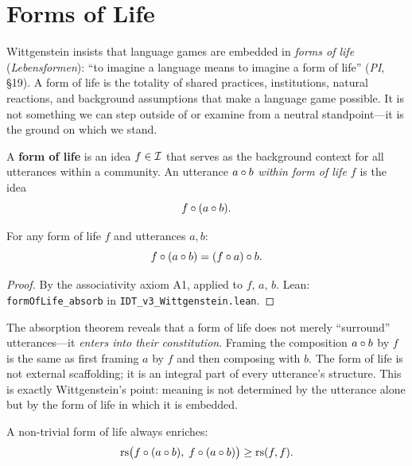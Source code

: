 \section{Forms of Life}

Wittgenstein insists that language games are embedded in \emph{forms of life}
(\textit{Lebensformen}): ``to imagine a language means to imagine a form of
life'' (\textit{PI}, \S19). A form of life is the totality of shared practices,
institutions, natural reactions, and background assumptions that make a language
game possible. It is not something we can step outside of or examine from a
neutral standpoint---it is the ground on which we stand.

\begin{definition}
\label{def:form-of-life}
A \textbf{form of life} is an idea $f \in \mathcal{I}$ that serves as the background
context for all utterances within a community. An utterance $a \circ b$
\emph{within form of life $f$} is the idea
\[
f \circ (a \circ b).
\]
\end{definition}

\begin{theorem}
\label{thm:form-absorb}
For any form of life $f$ and utterances $a, b$:
\[
f \circ (a \circ b) = (f \circ a) \circ b.
\]
\end{theorem}

\begin{proof}
By the associativity axiom A1, applied to $f$, $a$, $b$.
Lean: \texttt{formOfLife\_absorb} in \texttt{IDT\_v3\_Wittgenstein.lean}.
\end{proof}

\begin{interpretation}
The absorption theorem reveals that a form of life does not merely ``surround''
utterances---it \emph{enters into their constitution}. Framing the composition
$a \circ b$ by $f$ is the same as first framing $a$ by $f$ and then composing
with $b$. The form of life is not external scaffolding; it is an integral
part of every utterance's structure. This is exactly Wittgenstein's point:
meaning is not determined by the utterance alone but by the form of life
in which it is embedded.
\end{interpretation}

\begin{theorem}
\label{thm:form-enriches}
A non-trivial form of life always enriches:
\[
\mathrm{rs}\bigl(f \circ (a \circ b),\; f \circ (a \circ b)\bigr)
\geq \mathrm{rs}(f, f).
\]
\end{theorem}

